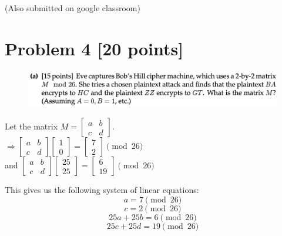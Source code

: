 \documentclass{ashoka-crypto}
\begin{document}
(Also submitted on google classroom)

\section*{Problem 4 [20 points]}

\begin{figure}[h]
\includegraphics[width=17cm]{4a}
\end{figure}


Let the matrix $M = 
\begin{bmatrix}
a & b \\
c & d
\end{bmatrix}$.\\

$\Rightarrow \begin{bmatrix}
a & b \\
c & d
\end{bmatrix}\begin{bmatrix}
1 \\
0
\end{bmatrix} = \begin{bmatrix}
7\\
2
\end{bmatrix} \pmod {26}$\\

and $\begin{bmatrix}
a & b \\
c & d
\end{bmatrix}\begin{bmatrix}
25 \\
25
\end{bmatrix} = \begin{bmatrix}
6\\
19
\end{bmatrix} \pmod {26}$

This gives us the following system of linear equations:
\begin{equation}
a = 7 \pmod {26}
\end{equation}
\begin{equation}
c = 2 \pmod {26}
\end{equation}
\begin{equation}
25a + 25b = 6 \pmod {26}
\end{equation}
\begin{equation}
25c + 25d = 19 \pmod {26}
\end{equation}
\end{document}

